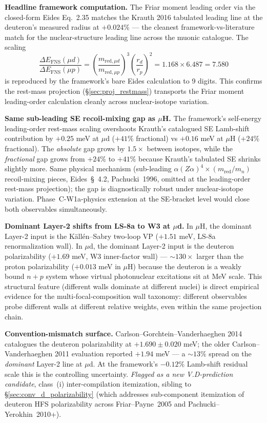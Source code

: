 \documentclass[11pt]{article}
\begin{document}
\textbf{Headline framework computation.}  The Friar moment leading
order via the closed-form Eides Eq.~2.35 matches the Krauth 2016
tabulated leading line at the deuteron's measured radius at
$+0.024\%$ --- the cleanest framework-vs-literature match for the
nuclear-structure leading line across the muonic catalogue.
The scaling
\begin{equation}
\frac{\Delta E_\text{FNS}(\mu d)}{\Delta E_\text{FNS}(\mu p)}
= \left(\frac{m_{\text{red},\mu d}}{m_{\text{red},\mu p}}\right)^3
  \left(\frac{r_d}{r_p}\right)^2
= 1.168 \times 6.487 = 7.580
\end{equation}
is reproduced by the framework's bare Eides calculation to 9 digits.
This confirms the rest-mass projection (\S\ref{sec:proj_restmass})
transports the Friar moment leading-order calculation cleanly
across nuclear-isotope variation.

\textbf{Same sub-leading SE recoil-mixing gap as $\mu$H.}  The
framework's self-energy leading-order rest-mass scaling overshoots
Krauth's catalogued SE Lamb-shift contribution by $+0.25$ meV at
$\mu$d ($+41\%$ fractional) vs $+0.16$ meV at $\mu$H ($+24\%$
fractional).  The \emph{absolute} gap grows by $1.5\times$ between
isotopes, while the \emph{fractional} gap grows from $+24\%$ to
$+41\%$ because Krauth's tabulated SE shrinks slightly more.  Same
physical mechanism (sub-leading $\alpha(Z\alpha)^4 \times
(m_\text{red}/m_n)$ recoil-mixing pieces, Eides~\S~4.2, Pachucki~1996,
omitted at the leading-order rest-mass projection); the gap is
diagnostically robust under nuclear-isotope variation.
Phase~C-W1a-physics extension at the SE-bracket level would close
both observables simultaneously.

\textbf{Dominant Layer-2 shifts from LS-8a to W3 at $\mu$d.}  In
$\mu$H, the dominant Layer-2 input is the K\"all\'en--Sabry two-loop
VP ($+1.51$ meV, LS-8a renormalization wall).  In $\mu$d, the
dominant Layer-2 input is the deuteron polarizability ($+1.69$ meV,
W3 inner-factor wall) --- $\sim 130\times$ larger than the proton
polarizability ($+0.013$ meV in $\mu$H) because the deuteron is a
weakly bound $n+p$ system whose virtual photonuclear excitations sit
at MeV scale.  This structural feature (different walls dominate at
different nuclei) is direct empirical evidence for the
multi-focal-composition wall taxonomy: different observables probe
different walls at different relative weights, even within the same
projection chain.

\textbf{Convention-mismatch surface.}  Carlson--Gorchtein--Vanderhaeghen
2014 catalogues the deuteron polarizability at $+1.690 \pm 0.020$
meV; the older Carlson--Vanderhaeghen 2011 evaluation reported
$+1.94$ meV --- a $\sim 13\%$ spread on the \emph{dominant} Layer-2
line at $\mu$d.  At the framework's $-0.12\%$ Lamb-shift residual
scale this is the controlling uncertainty.  \emph{Flagged as a new
V.D-prediction candidate}, class~(i) inter-compilation itemization,
sibling to \S\ref{sec:conv_d_polarizability} (which addresses
sub-component itemization of deuteron HFS polarizability across
Friar--Payne~2005 and Pachucki--Yerokhin~2010+).
\end{document}
